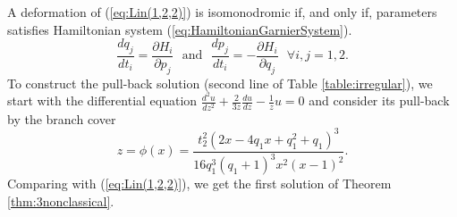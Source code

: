 \documentclass[12]{amsart}
\begin{document}
A deformation of (\ref{eq:Lin(1,2,2)}) is isomonodromic if, and only if, parameters satisfies Hamiltonian system
(\ref{eq:HamiltonianGarnierSystem}).
\begin{equation}\label{eq:HamiltonianGarnierSystemK}
\frac{dq_j}{dt_i}=\frac{\partial H_i}{\partial p_j}\ \ \ \text{and}\ \ \ \frac{dp_j}{dt_i}=-\frac{\partial H_i}{\partial q_j}\ \ \ 
\forall i,j=1,2.
\end{equation}
To construct the pull-back solution (second line of Table \ref{table:irregular}),
we start with the differential equation  $\frac{d^2u}{d z^2}+\frac{2}{3z}\frac{du}{d z}-\frac{1}{z}u=0$ 
and consider its pull-back 
by the branch cover
$$z=\phi(x)=\frac{t_2^2(2x-4q_1x+q_1^2+q_1)^3}{16q_1^3(q_1+1)^3x^2(x-1)^2}.$$
Comparing with (\ref{eq:Lin(1,2,2)}), we get the first solution of Theorem \ref{thm:3nonclassical}.
\end{document}
